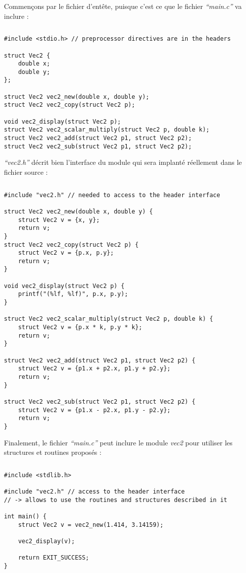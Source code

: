 \documentclass[../../../main.tex]{subfiles}
\begin{document}
Commençons par le fichier d'entête, puisque c'est ce que le fichier \textit{``main.c''} va inclure :
\begin{lstlisting}[title=vec2.h]
\end{lstlisting}
\begin{verbatim}
#include <stdio.h> // preprocessor directives are in the headers

struct Vec2 {
	double x;
	double y;
};

struct Vec2 vec2_new(double x, double y);
struct Vec2 vec2_copy(struct Vec2 p);

void vec2_display(struct Vec2 p);
struct Vec2 vec2_scalar_multiply(struct Vec2 p, double k);
struct Vec2 vec2_add(struct Vec2 p1, struct Vec2 p2);
struct Vec2 vec2_sub(struct Vec2 p1, struct Vec2 p2);
\end{verbatim}
\textit{``vec2.h''} décrit bien l'interface du module qui sera implanté réellement dans le fichier source :
\begin{lstlisting}[title=vec2.c]
\end{lstlisting}
\begin{verbatim}
#include "vec2.h" // needed to access to the header interface

struct Vec2 vec2_new(double x, double y) {
	struct Vec2 v = {x, y};
	return v;
}
struct Vec2 vec2_copy(struct Vec2 p) {
	struct Vec2 v = {p.x, p.y};
	return v;
}

void vec2_display(struct Vec2 p) {
	printf("(%lf, %lf)", p.x, p.y);
}

struct Vec2 vec2_scalar_multiply(struct Vec2 p, double k) {
	struct Vec2 v = {p.x * k, p.y * k};
	return v;
}

struct Vec2 vec2_add(struct Vec2 p1, struct Vec2 p2) {
	struct Vec2 v = {p1.x + p2.x, p1.y + p2.y};
	return v;
}

struct Vec2 vec2_sub(struct Vec2 p1, struct Vec2 p2) {
	struct Vec2 v = {p1.x - p2.x, p1.y - p2.y};
	return v;
}
\end{verbatim}
Finalement, le fichier \textit{``main.c''} peut inclure le module \textit{vec2} pour utiliser les structures et routines proposés :
\begin{lstlisting}[title=main.c]
\end{lstlisting}
\begin{verbatim}
#include <stdlib.h>

#include "vec2.h" // access to the header interface
// -> allows to use the routines and structures described in it

int main() {
	struct Vec2 v = vec2_new(1.414, 3.14159);

	vec2_display(v);

	return EXIT_SUCCESS;
}
\end{verbatim}
\end{document}
